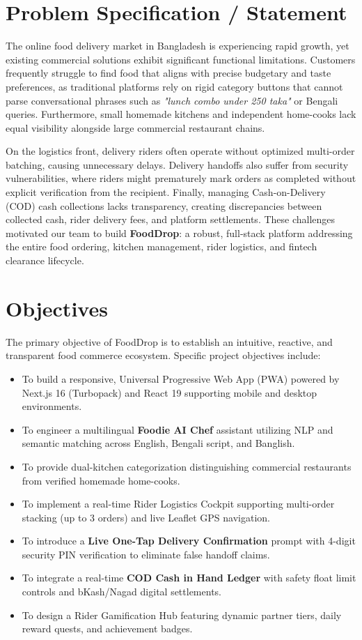 \documentclass[12pt,a4paper]{report}
\begin{document}
\section{Problem Specification / Statement}
The online food delivery market in Bangladesh is experiencing rapid growth, yet existing commercial solutions exhibit significant functional limitations. Customers frequently struggle to find food that aligns with precise budgetary and taste preferences, as traditional platforms rely on rigid category buttons that cannot parse conversational phrases such as \textit{"lunch combo under 250 taka"} or Bengali queries. Furthermore, small homemade kitchens and independent home-cooks lack equal visibility alongside large commercial restaurant chains.

On the logistics front, delivery riders often operate without optimized multi-order batching, causing unnecessary delays. Delivery handoffs also suffer from security vulnerabilities, where riders might prematurely mark orders as completed without explicit verification from the recipient. Finally, managing Cash-on-Delivery (COD) cash collections lacks transparency, creating discrepancies between collected cash, rider delivery fees, and platform settlements. These challenges motivated our team to build \textbf{FoodDrop}: a robust, full-stack platform addressing the entire food ordering, kitchen management, rider logistics, and fintech clearance lifecycle.

\section{Objectives}
The primary objective of FoodDrop is to establish an intuitive, reactive, and transparent food commerce ecosystem. Specific project objectives include:
\begin{itemize}
    \item To build a responsive, Universal Progressive Web App (PWA) powered by Next.js 16 (Turbopack) and React 19 supporting mobile and desktop environments.
    \item To engineer a multilingual \textbf{Foodie AI Chef} assistant utilizing NLP and semantic matching across English, Bengali script, and Banglish.
    \item To provide dual-kitchen categorization distinguishing commercial restaurants from verified homemade home-cooks.
    \item To implement a real-time Rider Logistics Cockpit supporting multi-order stacking (up to 3 orders) and live Leaflet GPS navigation.
    \item To introduce a \textbf{Live One-Tap Delivery Confirmation} prompt with 4-digit security PIN verification to eliminate false handoff claims.
    \item To integrate a real-time \textbf{COD Cash in Hand Ledger} with safety float limit controls and bKash/Nagad digital settlements.
    \item To design a Rider Gamification Hub featuring dynamic partner tiers, daily reward quests, and achievement badges.
\end{itemize}
\end{document}
